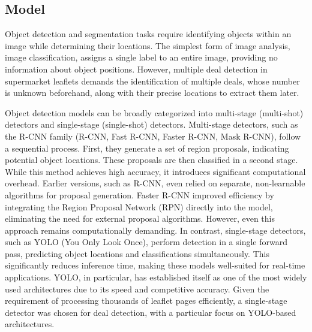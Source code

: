 \documentclass[11pt]{article}
\begin{document}
\subsection{Model}
Object detection and segmentation tasks require identifying objects within an image while determining their locations. The simplest form of image analysis, image classification, assigns a single label to an entire image, providing no information about object positions. However, multiple deal detection in supermarket leaflets demands the identification of multiple deals, whose number is unknown beforehand, along with their precise locations to extract them later.

Object detection models can be broadly categorized into multi-stage (multi-shot) detectors and single-stage (single-shot) detectors. Multi-stage detectors, such as the R-CNN family (R-CNN, Fast R-CNN, Faster R-CNN, Mask R-CNN), follow a sequential process. First, they generate a set of region proposals, indicating potential object locations. These proposals are then classified in a second stage. While this method achieves high accuracy, it introduces significant computational overhead. Earlier versions, such as R-CNN, even relied on separate, non-learnable algorithms for proposal generation. Faster R-CNN improved efficiency by integrating the Region Proposal Network (RPN) directly into the model, eliminating the need for external proposal algorithms. However, even this approach remains computationally demanding. In contrast, single-stage detectors, such as YOLO (You Only Look Once), perform detection in a single forward pass, predicting object locations and classifications simultaneously. This significantly reduces inference time, making these models well-suited for real-time applications. YOLO, in particular, has established itself as one of the most widely used architectures due to its speed and competitive accuracy. Given the requirement of processing thousands of leaflet pages efficiently, a single-stage detector was chosen for deal detection, with a particular focus on YOLO-based architectures.
\end{document}
